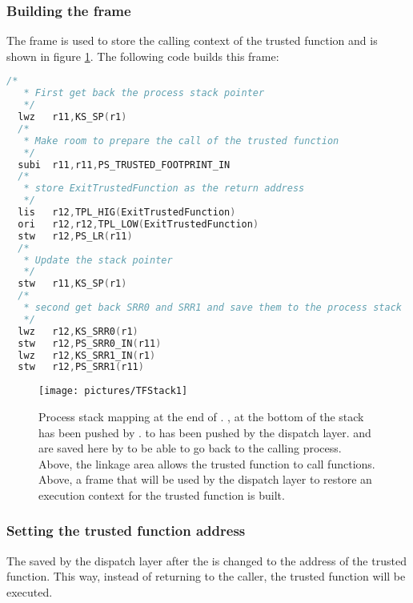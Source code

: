 \subsubsection{Building the frame}

The frame is used to store the calling context of the trusted function and is shown in figure \ref{fig:tfstackmapping}. The following code builds this frame:

\begin{lstlisting}[language=C]
  /*
   * First get back the process stack pointer
   */
  lwz   r11,KS_SP(r1)
  /*
   * Make room to prepare the call of the trusted function
   */
  subi  r11,r11,PS_TRUSTED_FOOTPRINT_IN
  /*
   * store ExitTrustedFunction as the return address
   */
  lis   r12,TPL_HIG(ExitTrustedFunction)
  ori   r12,r12,TPL_LOW(ExitTrustedFunction)
  stw   r12,PS_LR(r11)
  /*
   * Update the stack pointer
   */
  stw   r11,KS_SP(r1)
  /*
   * second get back SRR0 and SRR1 and save them to the process stack
   */
  lwz   r12,KS_SRR0(r1)
  stw   r12,PS_SRR0_IN(r11)
  lwz   r12,KS_SRR1_IN(r1)
  stw   r12,PS_SRR1(r11)
\end{lstlisting}

\begin{figure}[htbp] %
\begin{minipage}{0.65\textwidth}
    \centering
  \texttt{[image: pictures/TFStack1]} 
\end{minipage}
\begin{minipage}{0.35\textwidth}
  \caption{Process stack mapping at the end of . , at the bottom of the stack has been pushed by .  to  has been pushed by the dispatch layer.  and  are saved here by  to be able to go back to the calling process. Above, the linkage area allows the trusted function to call functions. Above, a frame that will be used by the dispatch layer to restore an execution context for the trusted function is built.}\label{fig:tfstackmapping}
\end{minipage}
\end{figure}

\subsubsection{Setting the trusted function address}

The  saved by the dispatch layer after the  is changed to the address of the trusted function. This way, instead of returning to the caller, the trusted function will be executed.

